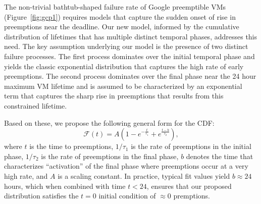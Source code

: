 The non-trivial bathtub-shaped failure rate of Google preemptible VMs (Figure~\ref{fig:gcp1}) requires models that capture the sudden onset of rise in preemptions near the deadline. 
Our new model, informed by the cumulative distribution of lifetimes that has multiple distinct temporal phases, addresses this need. The key assumption underlying our model is the presence of two distinct failure processes.
The first process dominates over the initial temporal phase and yields the classic exponential distribution that captures the high rate of early preemptions. The second process dominates over the final phase near the 24 hour maximum VM lifetime and is assumed to be characterized by an exponential term that captures the sharp rise in preemptions that results from this constrained lifetime. 

%
%

Based on these, we propose the following general form for the CDF:
\begin{equation}
  \label{eq:blend1}
  \mathscr{F}\left(t\right) = A\left(1-e^{-\frac{t}{\tau_1}} + e^{\frac{t-b}{\tau_2}}\right),
\end{equation}
where $t$ is the time to preemptions, $1/\tau_1$ is the rate of preemptions in the initial phase, $1/\tau_2$ is the rate of preemptions in the final phase, $b$ denotes the time that characterizes ``activation'' of the final phase where preemptions occur at a very high rate, and $A$ is a scaling constant. In practice, typical fit values yield $b \approx 24$ hours, which when combined with time $t < 24$, ensures that our proposed distribution satisfies the $t=0$ initial condition of $\approx 0$ premptions.

